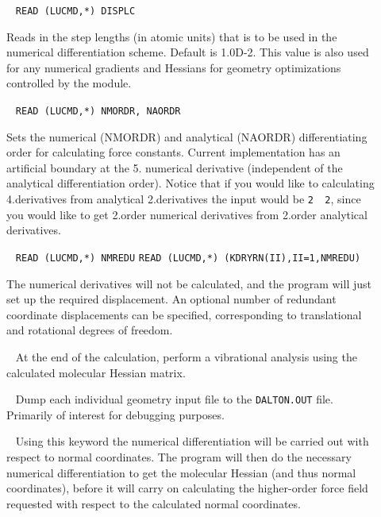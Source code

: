 \begin{description}

\item[]\verb| |\newline
\verb|READ (LUCMD,*) DISPLC|

Reads in the step lengths (in atomic units) that is to be used in the
numerical differentiation scheme. Default is 1.0D-2.
This value is also used for any numerical gradients and Hessians for
geometry optimizations controlled by the  module.

\item[]\verb| |\newline
\verb|READ (LUCMD,*) NMORDR, NAORDR|

Sets the numerical (NMORDR) and analytical (NAORDR) differentiating
order for calculating force constants. Current implementation has an
artificial boundary at the 5. numerical derivative (independent of the
analytical differentiation order). Notice that if you would like to
calculating 4.derivatives from analytical 2.derivatives the input
would be \verb|2  2|, since you would like to get 2.order numerical
derivatives from 2.order analytical derivatives.

\item[]\verb| |\newline
\verb|READ (LUCMD,*) NMREDU|\newline
\verb|READ (LUCMD,*) (KDRYRN(II),II=1,NMREDU)|

The numerical derivatives will not be calculated, and the program will
just set up the required displacement. An optional number of redundant
coordinate displacements can be specified, corresponding to translational and
rotational degrees of freedom.

\item[]\verb| |\newline
At the end of the calculation, perform a vibrational analysis using
the calculated molecular Hessian matrix.

\item[]\verb| |\newline
Dump each individual geometry input file to the \verb|DALTON.OUT|
file. Primarily of interest for debugging purposes.

\item[]\verb| |\newline
Using this keyword the numerical differentiation will be carried out
with respect to normal coordinates. The program will then do the
necessary numerical differentiation to get the molecular Hessian (and thus
normal coordinates), before it will carry on calculating the
higher-order force field requested with respect to the calculated normal
coordinates.


\end{description}
